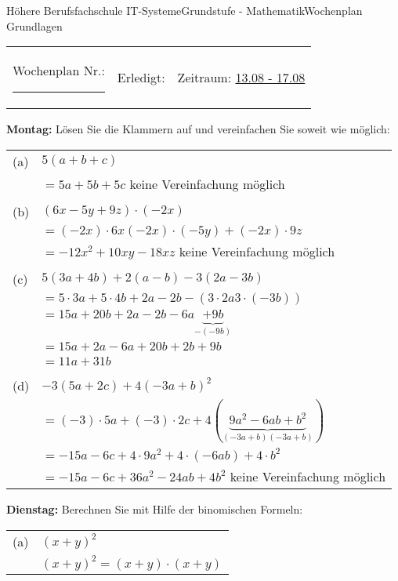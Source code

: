 \documentclass[oneside,openany,headings=optiontotoc,11pt,numbers=noenddot]{scrreprt}
\begin{document}
	\begin{worksheet}{Höhere Berufsfachschule IT-Systeme}{Grundstufe - Mathematik}{Wochenplan Grundlagen}
		\noindent
		\begin{tabularx}{\textwidth}{XXl}
			Wochenplan Nr.: \rule{0.15\textwidth}{1pt} & Erledigt: & Zeitraum: \underline{13.08 - 17.08}
		\end{tabularx}
	
		\begin{framed}
			\noindent
			\textbf{Montag:} Lösen Sie die Klammern auf und vereinfachen Sie soweit wie möglich:\\
			\begin{tabularx}{\textwidth}{lX}
				(a) & \(5(a+b+c)\)\\
				& \(= 5a + 5b + 5c\) keine Vereinfachung möglich\\\\
				(b) & \((6x-5y+9z)\cdot{}(-2x)\)\\
				& \(= (-2x)\cdot{}6x (-2x)\cdot(-5y) + (-2x)\cdot{}9z\)\\
				& \(= -12x^2 +10xy -18xz\) keine Vereinfachung möglich\\\\
				(c) & \(5(3a+4b)+2(a-b)-3(2a-3b)\)\\
				& \(= 5\cdot{}3a + 5\cdot{}4b +2a -2b - (3\cdot{}2a 3\cdot(-3b))\)\\
				& \(= 15a +20b +2a -2b -6a \underbrace{+9b}_{- (-9b)}\)\\
				& \(= 15a + 2a - 6a +20b + 2b + 9b\)\\
				& \(= 11a + 31b\)\\\\
				(d) & \(-3(5a+2c) + 4(-3a+b)^2\)\\
				& \(= (-3)\cdot{}5a + (-3)\cdot{}2c + 4(\underbrace{9a^2-6ab+b^2}_{(-3a+b)(-3a+b)})\)\\
				& \(= -15a -6c + 4\cdot{}9a^2 + 4\cdot{}(-6ab) +4\cdot{}b^2\)\\
				& \(= -15a -6c + 36a^2 - 24ab + 4b^2\) keine Vereinfachung möglich
			\end{tabularx}
		\end{framed}
		\begin{framed}
			\noindent
			\textbf{Dienstag:} Berechnen Sie mit Hilfe der binomischen Formeln:\\
			\begin{tabularx}{\textwidth}{lX}
				(a) & \((x+y)^2\)\\
				& \((x+y)^2 = (x+y)\cdot(x+y)\)\\

\end{tabularx}
\end{framed}
\end{worksheet}
\end{document}
